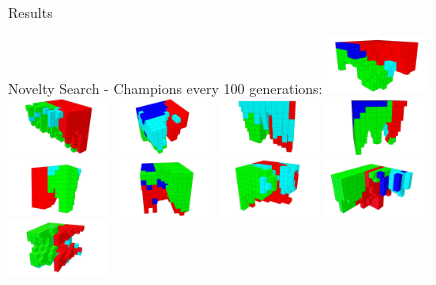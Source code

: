 \documentclass{beamer}
\begin{document}
\begin{frame}[allowframebreaks]{Results}
\begin{minipage}{\textwidth}
\begin{block}{Novelty Search - Champions every 100 generations:}
\includegraphics[width=0.2\textwidth]{../Figures/Robots/n_4_g_100.jpg}
\includegraphics[width=0.2\textwidth]{../Figures/Robots/n_4_g_200.jpg}
\includegraphics[width=0.2\textwidth]{../Figures/Robots/n_4_g_300.jpg}
\includegraphics[width=0.2\textwidth]{../Figures/Robots/n_4_g_400.jpg}
\includegraphics[width=0.2\textwidth]{../Figures/Robots/n_4_g_500.jpg}\\
\includegraphics[width=0.2\textwidth]{../Figures/Robots/n_4_g_600.jpg}
\includegraphics[width=0.2\textwidth]{../Figures/Robots/n_4_g_700.jpg}
\includegraphics[width=0.2\textwidth]{../Figures/Robots/n_4_g_800.jpg}
\includegraphics[width=0.2\textwidth]{../Figures/Robots/n_4_g_900.jpg}
\includegraphics[width=0.2\textwidth]{../Figures/Robots/n_4_g_1000.jpg}
\end{block}


\end{minipage}
\end{frame}
\end{document}
